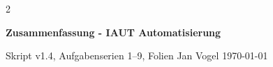 \documentclass[8pt]{extarticle}
\newcommand{\doctitle}{Zusammenfassung - IAUT Automatisierung}
\newcommand{\docauthors}{Jan Vogel}
\newcommand{\docdate}{\today}
\begin{document}
\begin{multicols*}{2}
  {\centering
   {\Large\bfseries \doctitle\par}\vspace{1pt}
   {\footnotesize Skript v1.4, Aufgabenserien 1--9, Folien
    \quad\textbullet\quad \docauthors
    \quad\textbullet\quad \docdate\par}}
  \vspace{4pt}
  
  \vspace{2pt}
  \tableofcontents
  \vspace{3pt}

  
  
  
  
  
  
  
  
  
  
\end{multicols*}
\end{document}
